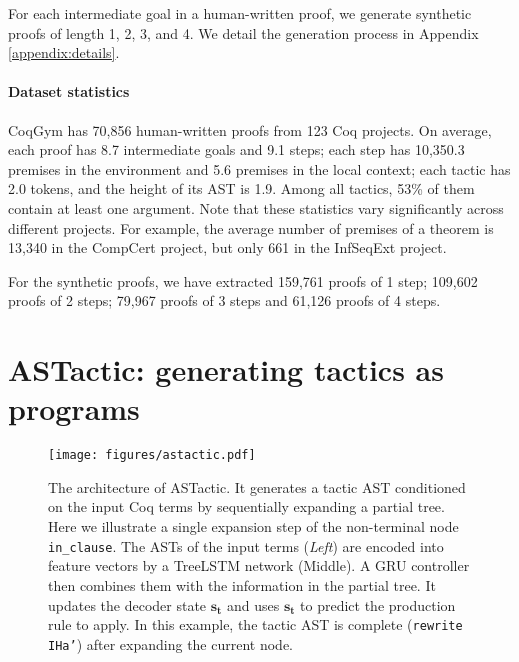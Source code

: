 \documentclass{article}
\newcommand{\smallsec}[1]{\vspace{-3mm} \paragraph{#1}}
\newcommand{\datasetname}{CoqGym}
\newcommand{\numberofprojects}{123 }
\newcommand{\numberofproofs}{70,856 }
\begin{document}
For each intermediate goal in a human-written proof, we generate synthetic proofs of length 1, 2, 3, and 4. We detail the generation process in Appendix \ref{appendix:details}.




\smallsec{Dataset statistics}
{\datasetname } has \numberofproofs human-written proofs from \numberofprojects Coq projects.
On average, each proof has 8.7 intermediate goals and 9.1 steps; each step has 10,350.3 premises in the environment and 5.6 premises in the local context; each tactic has 2.0 tokens, and the height of its AST is 1.9.
Among all tactics, 53\% of them contain at least one argument.
Note that these statistics vary significantly across different projects. For example, the average number of premises of a theorem is 13,340 in the CompCert project, but only 661 in the InfSeqExt project.



For the synthetic proofs, we have extracted 159,761 proofs of 1 step; 109,602 proofs of 2 steps; 79,967 proofs of 3 steps and 61,126 proofs of 4 steps.




\section{ASTactic: generating tactics as programs}


\begin{figure*}[ht]
\vskip 0.2in
\begin{center}
\vspace{-8mm}
\centerline{\texttt{[image: figures/astactic.pdf]}}
\vspace{-4mm}
\caption{The architecture of ASTactic. It generates a tactic AST conditioned on the input Coq terms by sequentially expanding a partial tree. Here we illustrate a single expansion step of the non-terminal node \texttt{in\_clause}. The ASTs of the input terms (\textit{Left}) are encoded into feature vectors by a TreeLSTM network (Middle). A GRU controller then combines them with the information in the partial tree. It updates the decoder state $\mathbf{s_t}$ and uses $\mathbf{s_t}$ to predict the production rule to apply. In this example, the tactic AST is complete (\texttt{rewrite IHa'}) after expanding the current node.}
\vspace{-4mm}
\label{fig:astactic}
\end{center}
\vskip -0.2in
\end{figure*}
\end{document}

